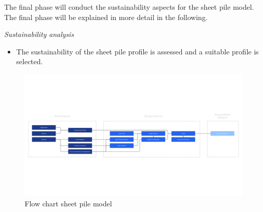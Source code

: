 The final phase will conduct the sustainability aspects for the sheet pile model. The final phase will be explained in more detail in the following.

\textit{Sustainability analysis}

\begin{itemize}
    \item The sustainability of the sheet pile profile is assessed and a suitable profile is selected. 
\end{itemize}

\begin{figure}[H]
    \centering
    \includegraphics[width=\linewidth]{figures/ch3/FlowChart Structural (2).png}
    \caption{Flow chart sheet pile model}
    \label{fig:flow_chart}
\end{figure}



